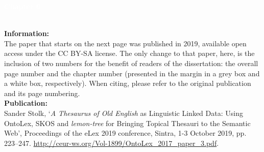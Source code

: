 \noindent{\color{white}\rule{\textwidth}{0.01em}}
\checkoddpage\ifoddpage\newpage\mbox{}\else\fi

\thispagestyle{empty}


\begin{center}
\setlength\fboxsep{1cm}
\noindent\colorbox{evokelightblue}{
\parbox[c][1.0in-2cm]{\textwidth-2cm}{\RaggedLeft\Huge \textbf{\textcolor{white}{Chapter 6}}}}
\end{center}

\noindent{\color{lightgray}\rule{\textwidth}{0.4em}}
\\[2em]
\noindent\textbf{Information:}\\
The paper that starts on the next page was published in 2019, available open access under the CC BY-SA license. The only change to that paper, here, is the inclusion of two numbers for the benefit of readers of the dissertation: the overall page number and the chapter number (presented in the margin in a grey box and a white box, respectively). When citing, please refer to the original publication and its page numbering.
\\[1em]
\noindent\textbf{Publication:}\\
    Sander Stolk, `\emph{A Thesaurus of Old English} as Linguistic Linked Data: Using OntoLex, SKOS and \emph{lemon-tree} for Bringing Topical Thesauri to the Semantic Web', Proceedings of the eLex 2019 conference, Sintra, 1-3 October 2019, pp. 223–247. \url{http://ceur-ws.org/Vol-1899/OntoLex_2017_paper_3.pdf}.
\noindent
\\[1em]
\noindent{\color{lightgray}\rule{\textwidth}{0.4em}}

